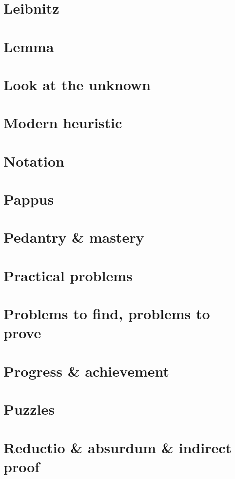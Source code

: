 \documentclass[oneside]{book}
\numberwithin{equation}{section}
\begin{document}
\section*{Leibnitz}

\section*{Lemma}

\section*{Look at the unknown}

\section*{Modern heuristic}

\section*{Notation}

\section*{Pappus}

\section*{Pedantry \& mastery}

\section*{Practical problems}

\section*{Problems to find, problems to prove}

\section*{Progress \& achievement}

\section*{Puzzles}

\section*{Reductio \& absurdum \& indirect proof}
\end{document}
